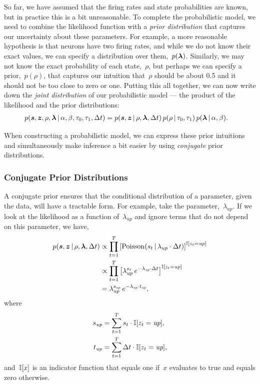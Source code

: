 So far, we have assumed that the firing rates and state probabilities are known, but in practice 
this is a bit unreasonable. To complete the probabilistic model, we need 
to combine the likelihood function with a \emph{prior distribution} that 
captures our uncertainty about these parameters. 
For example, a more reasonable hypothesis is that neurons have 
two firing rates, and while we do not know their exact values, we can 
specify a distribution over them,~$p(\boldsymbol{\lambda})$. Similarly, we may not know 
the exact probability of each state,~$\rho$, but perhaps we can specify 
a prior,~$p(\rho)$, that captures our intuition that~$\rho$ should be about 0.5 and it should 
not be too close to zero or one. 
Putting this all together, we can now write down the \emph{joint
  distribution} of our probabilistic model --- the
product of the likelihood and the prior distributions:
\begin{align}
  \label{eq:full_joint}
  p(\boldsymbol{s}, \boldsymbol{z}, \rho, \boldsymbol{\lambda} \,|\, \alpha, \beta, \tau_0, \tau_1, \Delta t) 
  &= p(\boldsymbol{s}, \boldsymbol{z} \,|\, \rho, \boldsymbol{\lambda}, \Delta t) \,
  p(\rho \,|\, \tau_0, \tau_1) \, 
     p(\boldsymbol{\lambda} \,|\, \alpha, \beta).
\end{align}

When constructing a probabilistic model, we can express these prior
intuitions and simultaneously make inference a bit easier by using
\emph{conjugate} prior distributions.


\subsubsection{Conjugate Prior Distributions}
A conjugate prior ensures that the conditional distribution of a
parameter, given the data, will have a tractable form.  For example,
take the parameter,~$\lambda_{\textit{up}}$. If we look at the
likelihood as a function of~$\lambda_{\textit{up}}$ and ignore terms
that do not depend on this parameter, we have,
\begin{align}
  p(\boldsymbol{s}, \boldsymbol{z} \,|\, \rho, \boldsymbol{\lambda}, \Delta t)
  &\propto \prod_{t=1}^T \left[
    \mathrm{Poisson}(s_t \,|\, \lambda_{\textit{up}} \cdot \Delta t)
    \right]^{\mathbb{I}[z_t = \textit{up}]} \\
  &\propto \prod_{t=1}^T \left[
    \lambda_{\textit{up}}^{s_t} \,
    e^{-\lambda_{\textit{up}} \cdot \Delta t}
    \right]^{\mathbb{I}[z_t = \textit{up}]} \\
  &=
  \lambda_{\textit{up}}^{s_{\textit{up}}} \,
  e^{-\lambda_{\textit{up}} \cdot t_{\textit{up}}},
\end{align}
where
\begin{align}
  s_{\textit{up}} &= \sum_{t=1}^T s_t \cdot \mathbb{I}[z_t = \textit{up}], \\
  t_{\textit{up}} &= \sum_{t=1}^T \Delta t \cdot \mathbb{I}[z_t = \textit{up}],
\end{align}
and~$\mathbb{I}[x]$ is an indicator function that equals one if~$x$ evaluates to true
and equals zero otherwise.

